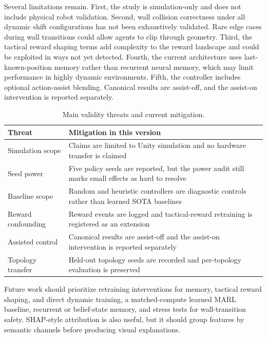 \documentclass[journal]{IEEEtran}
\begin{document}
Several limitations remain. First, the study is simulation-only and does not include physical robot validation. Second, wall collision correctness under all dynamic shift configurations has not been exhaustively validated. Rare edge cases during wall transitions could allow agents to clip through geometry. Third, the tactical reward shaping terms add complexity to the reward landscape and could be exploited in ways not yet detected. Fourth, the current architecture uses last-known-position memory rather than recurrent neural memory, which may limit performance in highly dynamic environments. Fifth, the controller includes optional action-assist blending. Canonical results are assist-off, and the assist-on intervention is reported separately.

\begin{table}[t]
\centering
\caption{Main validity threats and current mitigation.}
\label{tab:validity_threats}
\footnotesize
\begin{tabular}{p{2.3cm}p{5.0cm}}
\toprule
Threat & Mitigation in this version \\
\midrule
Simulation scope & Claims are limited to Unity simulation and no hardware transfer is claimed \\
Seed power & Five policy seeds are reported, but the power audit still marks small effects as hard to resolve \\
Baseline scope & Random and heuristic controllers are diagnostic controls rather than learned SOTA baselines \\
Reward confounding & Reward events are logged and tactical-reward retraining is registered as an extension \\
Assisted control & Canonical results are assist-off and the assist-on intervention is reported separately \\
Topology transfer & Held-out topology seeds are recorded and per-topology evaluation is preserved \\
\bottomrule
\end{tabular}
\end{table}

Future work should prioritize retraining interventions for memory, tactical
reward shaping, and direct dynamic training, a matched-compute learned MARL
baseline, recurrent or belief-state memory, and stress tests for wall-transition
safety. SHAP-style attribution is also useful, but it should group features by
semantic channels before producing visual explanations.

\end{document}
